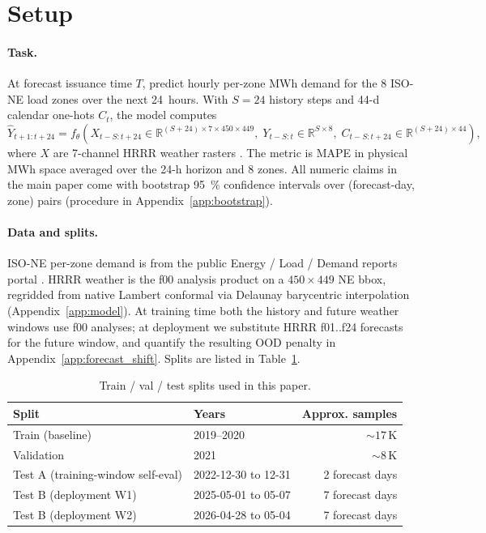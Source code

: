 
\section{Setup}
\label{sec:setup}

\paragraph{Task.}
At forecast issuance time $T$, predict hourly per-zone MWh demand for
the 8 ISO-NE load zones over the next 24~hours. With $S=24$ history
steps and 44-d calendar one-hots $C_t$, the model computes
\begin{equation}
\hat Y_{t+1:t+24} = f_\theta(X_{t-S:t+24} \in \mathbb{R}^{(S+24)\times 7\times 450 \times 449},\;
   Y_{t-S:t} \in \mathbb{R}^{S\times 8},\;
   C_{t-S:t+24} \in \mathbb{R}^{(S+24)\times 44}),
\label{eq:task}
\end{equation}
where $X$ are 7-channel HRRR weather rasters
\citep{benjamin2016hrrr,noaa2024hrrr}. The metric is MAPE in physical
MWh space averaged over the 24-h horizon and 8 zones. All numeric
claims in the main paper come with bootstrap 95~\% confidence intervals
over (forecast-day, zone) pairs (procedure in
Appendix~\ref{app:bootstrap}).

\paragraph{Data and splits.}
ISO-NE per-zone demand is from the public Energy / Load / Demand
reports portal \citep{isone2024data}. HRRR weather is the f00 analysis
product on a $450 \times 449$ NE bbox, regridded from native Lambert
conformal via Delaunay barycentric interpolation
(Appendix~\ref{app:model}). At training time both the history and
future weather windows use f00 analyses; at deployment we substitute
HRRR f01..f24 forecasts for the future window, and quantify the
resulting OOD penalty in Appendix~\ref{app:forecast_shift}. Splits are
listed in Table~\ref{tab:splits}.

\begin{table}[h]
\centering\small
\caption{Train / val / test splits used in this paper.}
\label{tab:splits}
\begin{tabular}{@{}llr@{}}
\toprule
Split & Years & Approx. samples \\
\midrule
Train (baseline)               & 2019--2020              & $\sim 17\,$K \\
Validation                     & 2021                    & $\sim 8\,$K  \\
Test A (training-window self-eval) & 2022-12-30 to 12-31  & 2 forecast days \\
Test B (deployment W1)         & 2025-05-01 to 05-07     & 7 forecast days \\
Test B (deployment W2)         & 2026-04-28 to 05-04     & 7 forecast days \\
\bottomrule
\end{tabular}
\end{table}

